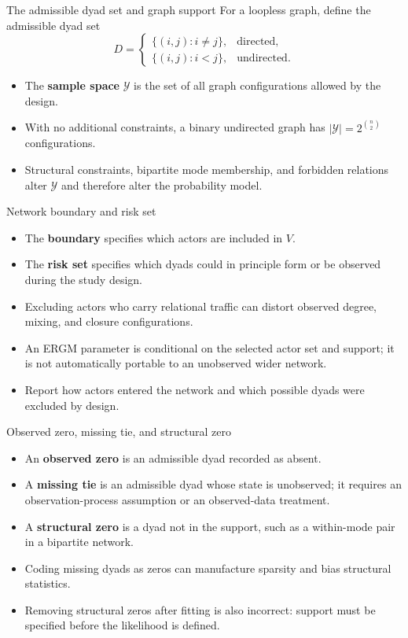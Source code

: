 \documentclass[aspectratio=169,11pt]{beamer}
\newcommand{\term}[1]{\textbf{\color{nupurple}#1}}
\begin{document}
\begin{frame}{The admissible dyad set and graph support}
For a loopless graph, define the admissible dyad set
\[
D=\begin{cases}
\{(i,j):i\ne j\}, & \text{directed},\\
\{(i,j):i<j\}, & \text{undirected}.
\end{cases}
\]
\begin{itemize}
\item The \term{sample space} $\mathcal{Y}$ is the set of all graph configurations allowed by the design.
\item With no additional constraints, a binary undirected graph has $|\mathcal{Y}|=2^{\binom n2}$ configurations.
\item Structural constraints, bipartite mode membership, and forbidden relations alter $\mathcal{Y}$ and therefore alter the probability model.
\end{itemize}
\end{frame}

\begin{frame}{Network boundary and risk set}
\begin{itemize}
\item The \term{boundary} specifies which actors are included in $V$.
\item The \term{risk set} specifies which dyads could in principle form or be observed during the study design.
\item Excluding actors who carry relational traffic can distort observed degree, mixing, and closure configurations.
\item An ERGM parameter is conditional on the selected actor set and support; it is not automatically portable to an unobserved wider network.
\item Report how actors entered the network and which possible dyads were excluded by design.
\end{itemize}
\end{frame}

\begin{frame}{Observed zero, missing tie, and structural zero}
\begin{itemize}
\item An \term{observed zero} is an admissible dyad recorded as absent.
\item A \term{missing tie} is an admissible dyad whose state is unobserved; it requires an observation-process assumption or an observed-data treatment.
\item A \term{structural zero} is a dyad not in the support, such as a within-mode pair in a bipartite network.
\item Coding missing dyads as zeros can manufacture sparsity and bias structural statistics.
\item Removing structural zeros after fitting is also incorrect: support must be specified before the likelihood is defined.
\end{itemize}
\end{frame}
\end{document}
